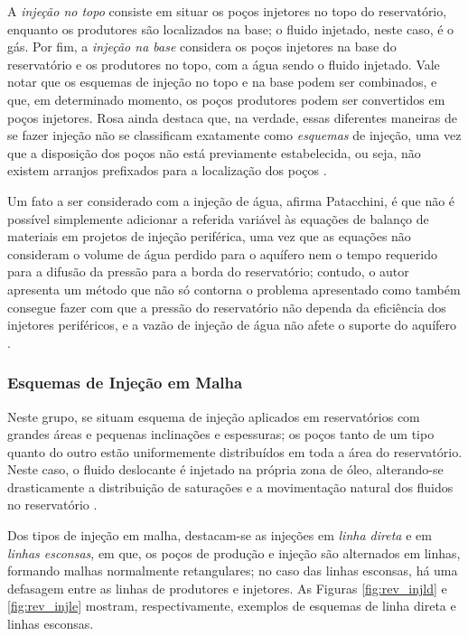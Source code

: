 A \textit{inje\c{c}\~{a}o no topo} consiste em situar os po\c{c}os injetores no topo do reservat\'{o}rio, enquanto os produtores s\~{a}o localizados na base; o fluido injetado, neste caso, \'{e} o g\'{a}s. Por fim, a \textit{inje\c{c}\~{a}o na base} considera os po\c{c}os injetores na base do reservat\'{o}rio e os produtores no topo, com a \'{a}gua sendo o fluido injetado. Vale notar que os esquemas de inje\c{c}\~{a}o no topo e na base podem ser combinados, e que, em determinado momento, os po\c{c}os produtores podem ser convertidos em po\c{c}os injetores. Rosa ainda destaca que, na verdade, essas diferentes maneiras de se fazer inje\c{c}\~{a}o n\~{a}o se classificam exatamente como
\textit{esquemas} de inje\c{c}\~{a}o, uma vez que a disposi\c{c}\~{a}o dos po\c{c}os n\~{a}o est\'{a} previamente estabelecida, ou seja, n\~{a}o existem arranjos prefixados para a localiza\c{c}\~{a}o dos po\c{c}os \cite[p. 566]{engres}.


Um fato a ser considerado com a inje\c{c}\~{a}o de \'{a}gua, afirma Patacchini, \'{e} que n\~{a}o \'{e} poss\'{i}vel simplemente adicionar a referida vari\'{a}vel \`{a}s equa\c{c}\~{o}es de balan\c{c}o de materiais em projetos de inje\c{c}\~{a}o perif\'{e}rica, uma vez que as equa\c{c}\~{o}es n\~{a}o consideram o volume de \'{a}gua perdido para o aqu\'{i}fero nem o tempo requerido para a difus\~{a}o da press\~{a}o para a borda do reservat\'{o}rio; contudo, o autor apresenta um m\'{e}todo que n\~{a}o s\'{o} contorna o problema apresentado como tamb\'{e}m consegue fazer com que a press\~{a}o do reservat\'{o}rio n\~{a}o dependa da efici\^{e}ncia dos injetores perif\'{e}ricos, e a vaz\~{a}o de inje\c{c}\~{a}o de \'{a}gua n\~{a}o afete o suporte do aqu\'{i}fero \cite{PATACCHINI2017720}.

\subsubsection{Esquemas de Inje\c{c}\~{a}o em Malha}
Neste grupo, se situam esquema de inje\c{c}\~{a}o aplicados em reservat\'{o}rios com grandes \'{a}reas e pequenas inclina\c{c}\~{o}es e espessuras; os po\c{c}os tanto de um tipo quanto do outro est\~{a}o uniformemente distribu\'{i}dos em toda a \'{a}rea do reservat\'{o}rio. Neste caso, o fluido deslocante \'{e} injetado na pr\'{o}pria zona de \'{o}leo, alterando-se drasticamente a distribui\c{c}\~{a}o de satura\c{c}\~{o}es e a movimenta\c{c}\~{a}o natural dos fluidos no reservat\'{o}rio \cite[p. 567]{engres}.

Dos tipos de inje\c{c}\~{a}o em malha, destacam-se as inje\c{c}\~{o}es em \textit{linha direta} e em \textit{linhas esconsas}, em que, os po\c{c}os de produ\c{c}\~{a}o e inje\c{c}\~{a}o s\~{a}o alternados em linhas, formando malhas normalmente retangulares; no caso das linhas esconsas, h\'{a} uma defasagem entre as linhas de produtores e injetores. As Figuras \ref{fig:rev_injld} e \ref{fig:rev_injle} mostram, respectivamente, exemplos de esquemas de linha direta e linhas esconsas.

